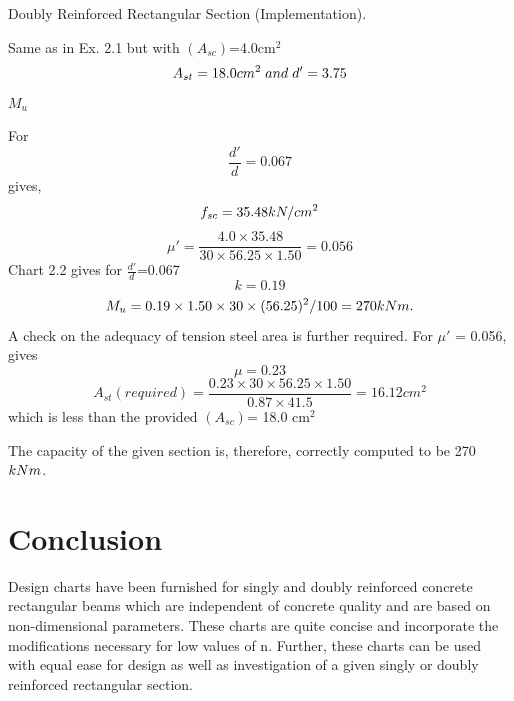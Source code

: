 \begin{example} Doubly Reinforced Rectangular Section (Implementation).

\given  Same as in Ex. 2.1 but with $(A_{sc})$=4.0cm$^{2}$
$$A_{st}=18.0cm^2 \hspace{0.1cm}and\hspace{0.1cm} d'=3.75$$
\required $M_u$

\solution For
$$\frac{d'}{d}=0.067$$  gives,
$$f_{sc}=35.48kN/cm^2$$
$$\mu'=\frac{4.0 \times 35.48}{30 \times 56.25 \times 1.50}=0.056$$
Chart 2.2 gives for $\frac{d'}{d}$=0.067
$$k=0.19$$
$$M_u= 0.19 \times 1.50 \times 30 \times (56.25)^2/100=270kNm.$$ 
A check on the adequacy of tension steel area is further required. For $\mu'$ = 0.056, 
gives
$$\mu=0.23$$
$$A_{st}(required)=\frac{0.23 \times 30 \times 56.25 \times 1.50}{0.87 \times 41.5}=16.12cm^2$$
which is less than the provided $(A_{sc})$= 18.0 cm$^{2}$

The capacity of the given section is, therefore, correctly computed to be 270 $kNm$.
\end{example}
\newpage
\section{Conclusion}
Design charts have been furnished for singly and doubly reinforced concrete rectangular
beams which are independent of concrete quality and are based on non-dimensional
parameters. These charts are quite concise and incorporate the modiﬁcations necessary for
low values of n. Further, these charts can be used with equal ease for design as well as
investigation of a given singly or doubly reinforced rectangular section.






